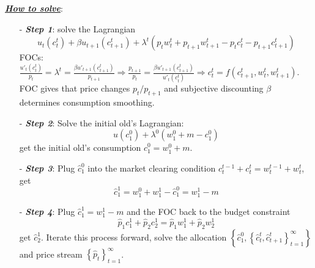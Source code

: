 \documentclass[10pt,landscape,a4paper]{article}
\begin{document}
\begin{multicols*}{4}
\scriptsize
\underline{\textit{\textbf{How to solve}}}:
\begin{itemize}
    \item[-] \textbf{\textit{Step 1}}: solve the Lagrangian
    $$ u_t(c^t_t)+\beta u_{t+1}(c^t_{t+1})+\lambda^t\left( p_t w_t^t+p_{t+1}w_{t+1}^t-p_t c_t^t-p_{t+1}c^t_{t+1} \right)$$
    FOCs: $\frac{u'_t(c^t_t)}{p_t}=\lambda^t =\frac{\beta u'_{t+1}(c^t_{t+1})}{p_{t+1}}\Rightarrow \frac{p_{t+1}}{p_t}=\frac{\beta u'_{t+1}(c^t_{t+1})}{u'_t(c_t^t)}\Rightarrow c_t^t=f(c^t_{t+1},w^t_t,w^t_{t+1})$. FOC gives that price changes $p_t/p_{t+1}$ and subjective discounting $\beta$ determines consumption smoothing.
    
    \item[-] \textit{\textbf{Step 2}}: Solve the initial old's Lagrangian:
    $$u(c^0_1)+\lambda^0\left(w_1^0+m-c_1^0\right)$$ get the initial old's consumption $\hat{c}^0_1=w_1^0+m$.
    
    \item[-] \textbf{\textit{Step 3}}: Plug $\hat{c}_1^0$ into the market clearing condition $c_t^{t-1} +c_t^t=w_t^{t-1}+w_t^t$, get
    $$\hat{c}_1^1=w_1^0+w_1^1-\hat{c}_1^0=w_1^1-m$$
    
    
    \item[-] \textit{\textbf{Step 4}}: Plug $\hat{c}_1^1=w_1^1-m$ and the FOC back to the budget constraint
    $$\hat{p}_1 c^1_1+\hat{p}_2 c^1_2 = \hat{p}_1 w^1_1+\hat{p}_2 w^1_2$$
    get $\hat{c}^1_2$. Iterate this process forward, solve the allocation $\left\{\hat{c}^0_1,\left\{\hat{c}^t_t,\hat{c}^t_{t+1}\right\}^{\infty}_{t=1}\right\}$ and price stream $\left\{\hat{p}_t\right\}^{\infty}_{t=1}$.
\end{itemize}


\end{multicols*}
\end{document}
